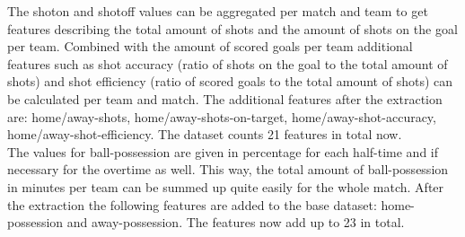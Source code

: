 The shoton and shotoff values can be aggregated per match and team to get features describing the total amount of shots and the amount of shots on the goal per team. Combined with the amount of scored goals per team additional features such as shot accuracy (ratio of shots on the goal to the total amount of shots) and shot efficiency (ratio of scored goals to the total amount of shots) can be calculated per team and match.
\newline
The additional features after the extraction are: home/away-shots, home/away-shots-on-target, home/away-shot-accuracy, home/away-shot-efficiency. The dataset counts 21 features in total now.
\\
The values for ball-possession are given in percentage for each half-time and if necessary for the overtime as well. This way, the total amount of ball-possession in minutes per team can be summed up quite easily for the whole match.
\newline
After the extraction the following features are added to the base dataset: home-possession and away-possession. The features now add up to 23 in total.

